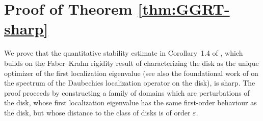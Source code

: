 \section{Proof of Theorem \ref{thm:GGRT-sharp}}\label{sec:GGRT-sharp}

We prove that the quantitative stability estimate in Corollary~1.4 of
\cite{Gomez-Guerra-Ramos-Tilli}, which builds on the Faber--Krahn rigidity
result of \cite{Nicola-Tilli} characterizing the disk as the unique optimizer
of the first localization eigenvalue (see also the foundational work of
\cite{Daubechies} on the spectrum of the Daubechies localization operator on
the disk), is sharp. The proof proceeds by constructing a family of domains
which are perturbations of the disk, whose first localization eigenvalue has
the same first-order behaviour as the disk, but whose distance to the class of
disks is of order $\varepsilon$.

